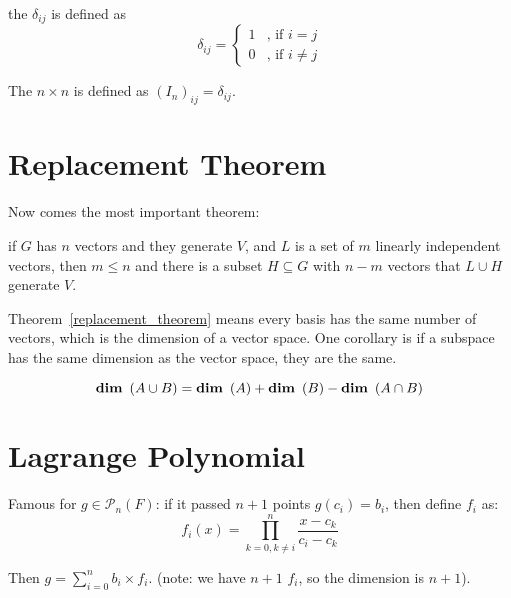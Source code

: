 \begin{definition}
	the   $\delta_{ij}$ is defined as 
	\begin{equation}
		\delta_{ij} = \begin{cases}
			1 & \text{, if } i = j \\
			0 & \text{, if } i \neq j
 		\end{cases}
	\end{equation}
\end{definition}

\begin{definition}
	The $n\times n$   is defined as $\left(I_n \right)_{ij} = \delta_{ij}$.
\end{definition}



\section{Replacement Theorem}
Now comes the most important theorem:
\begin{theorem}\label{replacement_theorem}
    if $G$ has $n$ vectors and they generate $V$, and $L$ is a set of $m$ linearly independent vectors, then $m \leq n$ and there is a subset $H \subseteq G$ with $n-m$ vectors that $L \cup H $ generate $V$.
    
\end{theorem}

Theorem~\ref{replacement_theorem} means every basis has the same number of vectors, which is the dimension of a vector space. One corollary is if a subspace has the same dimension as the vector space, they are the same.


\begin{theorem}
    \begin{equation}
        \displaystyle \mathop{\bf dim\/}~\left( A\cup B \right) = \displaystyle \mathop{\bf dim\/}~\left( A \right) + \displaystyle \mathop{\bf dim\/}~\left( B \right) - \displaystyle \mathop{\bf dim\/}~\left( A \cap B \right)
    \end{equation}    
\end{theorem}


\section{Lagrange Polynomial}
\begin{example}
   Famous  for $g \in \mathcal{P}_n (F)$: if it passed $n+1$ points $g(c_i) = b_i$, then define $f_i$ as:
\begin{equation}
    f_i(x) = \prod_{k=0,k \neq i}^{n} \frac{x - c_k}{c_i - c_k}
\end{equation}

Then $g = \sum_{i=0}^{n} b_i \times f_i $. (note: we have $n+1$ $f_i$, so the dimension is $n+1$). 
\end{example}



